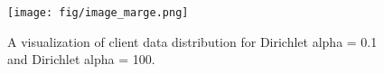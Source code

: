 \begin{figure}[htbp]
\centering
\texttt{[image: fig/image\_marge.png]}
\caption{A visualization  of client data distribution for Dirichlet alpha = 0.1 and Dirichlet alpha = 100.}
\label{fig:data}
\end{figure}





